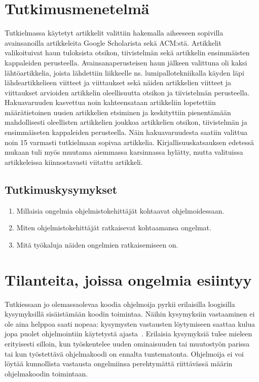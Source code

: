 \documentclass[finnish]{tktltiki2}
\theoremstyle{definition}
\theoremstyle{remark}
\begin{document}
\section{Tutkimusmenetelmä}
Tutkielmassa käytetyt artikkelit valittiin hakemalla aiheeseen sopivilla avainsanoilla artikkeleita Google Scholarista sekä ACM:stä. Artikkelit valikoituivat haun tuloksista otsikon, tiivistelmän sekä artikkelin ensimmäisten kappaleiden perusteella. Avainsanaperusteisen haun jälkeen valittuna oli kaksi lähtöartikkelia, joista lähdettiin liikkeelle ns. lumipallotekniikalla käyden läpi lähdeartikkelieen viitteet ja viittaukset sekä näiden artikkelien viitteet ja viittaukset arvioiden artikkelin oleellisuutta otsikon ja tiivistelmän perusteella. Hakuavaruuden kasvettua noin kahteensataan artikkeliin lopetettiin määrätietoinen uusien artikkelien etsiminen ja keskityttiin pienentämään mahdollisesti oleellisten artikkelien joukkoa artikkelien otsikon, tiivistelmän ja ensimmäiseten kappaleiden perusteella. Näin hakuavaruudesta saatiin valittua noin 15 varmasti tutkielmaan sopivaa artikkelia. Kirjallisuuskatsauksen edetessä mukaan tuli myös muutama aiemmassa karsinnassa hylätty, mutta valituissa artikkeleissa kiinnostavasti viitattu artikkeli.

\subsection{Tutkimuskysymykset}
\begin{enumerate}
\item Millaisia ongelmia ohjelmistokehittäjät kohtaavat ohjelmoidessaan.
\item Miten ohjelmistokehittäjät ratkaisevat kohtaamansa ongelmat.
\item Mitä työkaluja näiden ongelmien ratkaisemiseen on.
\end{enumerate}

\section{Tilanteita, joissa ongelmia esiintyy}
Tutkiessaan jo olemassaolevaa koodia ohjelmoija pyrkii erilaisilla loogisilla kysymyksillä sisäistämään koodin toimintaa. Näihin kysymyksiin vastaaminen ei ole aina helppoa saati nopeaa: kysymysten vastausten löytymiseen saattaa kulua jopa puolet ohjelmointiin käytetystä ajasta~\cite{eliciting-design-requirements-for-maintenance-oriented-ides}. Erilaisia kysymyksiä tulee mieleen erityisesti silloin, kun työskentelee uuden ominaisuuden tai muutostyön parissa tai kun työstettävä ohjelmakoodi on ennalta tuntematonta. Ohjelmoija ei voi löytää kunnollista vastausta ongelmiinsa perehtymättä riittävässä määrin ohjelmakoodin toimintaan.
\end{document}
